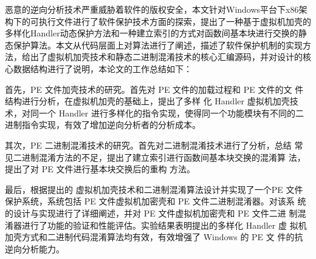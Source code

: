 \begin{conclusion}

恶意的逆向分析技术严重威胁着软件的版权安全，本文针对Windows平台下x86架构下的可执行文件进行了软件保护技术方面的探索，提出了一种基于虚拟机加壳的多样化Handler动态保护方法和一种建立索引的方式对函数间基本块进行交换的静态保护算法。本文从代码层面上对算法进行了阐述，描述了软件保护机制的实现方法，给出了虚拟机加壳技术和静态二进制混淆技术的核心汇编源码，并对设计的核心数据结构进行了说明，本论文的工作总结如下：

首先，PE 文件加壳技术的研究。首先对 PE 文件的加载过程和 PE 文件的文 件结构进行分析，在虚拟机加壳的基础上，提出了多样 化 Handler 虚拟机加壳技术，对同一个 Handler 进行多样化的指令实现，使得同一个功能模块有不同的二进制指令实现，有效了增加逆向分析者的分析成本。 

其次，PE 二进制混淆技术的研究。首先对二进制混淆技术进行了分析，总结 常见二进制混淆方法的不足，提出了建立索引进行函数间基本块交换的混淆算 法，提出了对 PE 文件进行基本块交换后的重构 方法。

最后，根据提出的 虚拟机加壳技术和二进制混淆算法设计并实现了一个PE 文件保护系统，系统包括 PE 文件虚拟机加密壳和 PE 文件二进制混淆器。对该系 统的设计与实现进行了详细阐述，并对 PE 文件虚拟机加密壳和 PE 文件二进 制混淆器进行了功能的验证和性能评估。实验结果表明提出的多样化 Handler 虚 拟机加壳方式和二进制代码混淆算法均有效，有效增强了 Windows 的 PE 文 件的抗逆向分析能力。


  
\end{conclusion}


